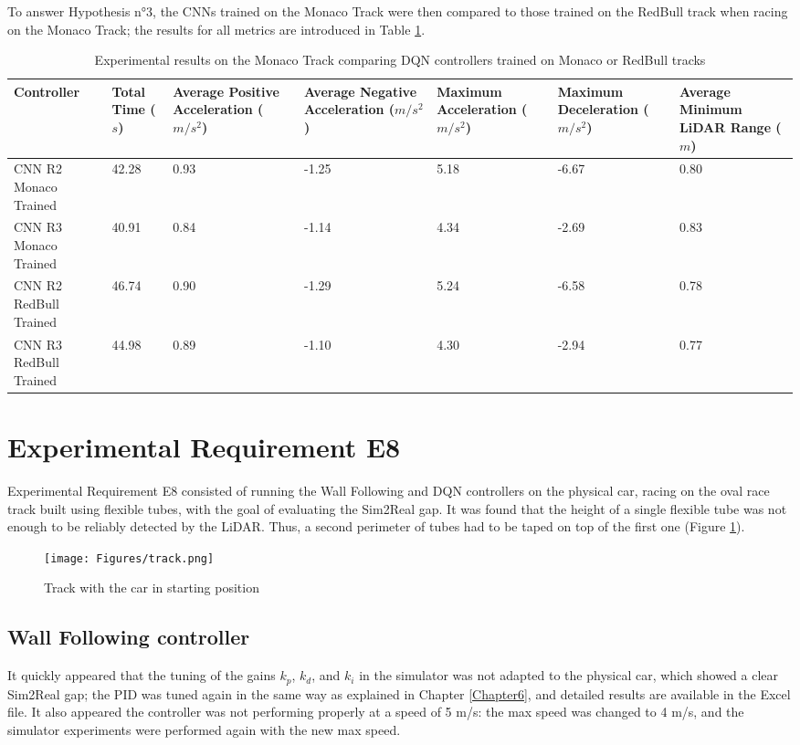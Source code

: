 To answer Hypothesis n°3, the CNNs trained on the Monaco Track were then compared to those trained on the RedBull track when racing on the Monaco Track; the results for all metrics are introduced in Table \ref{hyp3}.

\begin{table}
\centering
\begin{tabularx}{\textwidth}{||X|X|X|X|X|X|X||} 
\hline
 Controller & Total Time ($s$) & Average Positive Acceleration ($m/s^2$)& Average Negative Acceleration ($m/s^2$) & Maximum Acceleration ($m/s^2$) & Maximum Deceleration ($m/s^2$) & Average Minimum LiDAR Range ($m$)\\ [0.5ex] 
 \hline\hline
 CNN R2 Monaco Trained & 42.28 & 0.93 & -1.25 & 5.18 & -6.67 & 0.80\\[0.5ex] 
 \hline
 CNN R3 Monaco Trained & 40.91 & 0.84 & -1.14 & 4.34 & -2.69 & 0.83\\[0.5ex] 
 \hline
CNN R2 RedBull Trained & 46.74 & 0.90 & -1.29 & 5.24 & -6.58 & 0.78\\[0.5ex] 
 \hline
 CNN R3 RedBull Trained & 44.98 & 0.89 & -1.10 & 4.30 & -2.94 & 0.77\\[0.5ex] 
 \hline
 \end{tabularx}
\caption{Experimental results on the Monaco Track comparing DQN controllers trained on Monaco or RedBull tracks}
\label{hyp3}
\end{table}


\section{Experimental Requirement E8}
Experimental Requirement E8 consisted of running the Wall Following and DQN controllers on the physical car, racing on the oval race track built using flexible tubes, with the goal of evaluating the Sim2Real gap. It was found that the height of a single flexible tube was not enough to be reliably detected by the LiDAR. Thus, a second perimeter of tubes had to be taped on top of the first one (Figure \ref{track}).

\begin{figure}
\centering
\texttt{[image: Figures/track.png]}
\caption{Track with the car in starting position}
\label{track}
\end{figure}

\subsection{Wall Following controller}
It quickly appeared that the tuning of the gains $k_p$, $k_d$, and $k_i$ in the simulator was not adapted to the physical car, which showed a clear Sim2Real gap; the PID was tuned again in the same way as explained in Chapter \ref{Chapter6}, and detailed results are available in the Excel file. It also appeared the controller was not performing properly at a speed of 5 m/s: the max speed was changed to 4 m/s, and the simulator experiments were performed again with the new max speed. 
